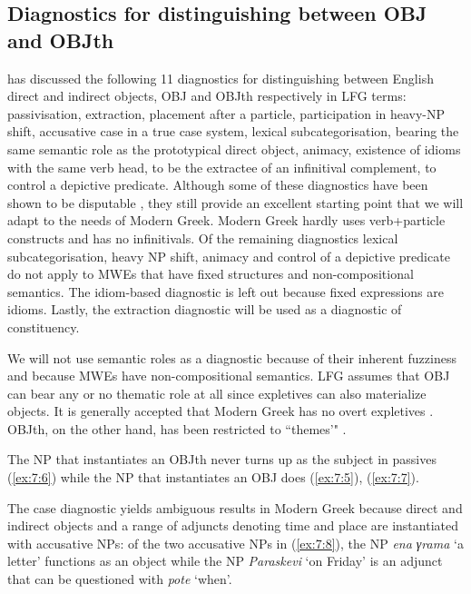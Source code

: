 \documentclass[output=paper]{langsci/langscibook}
\begin{document}
\subsection{Diagnostics for distinguishing between OBJ and OBJth }

\citet{hudson1992} has discussed the following 11 diagnostics for distinguishing between English direct and indirect objects, OBJ and OBJth  respectively in LFG terms: passivisation, extraction, placement after a particle, participation in heavy-NP shift, accusative case in a true case system, lexical subcategorisation, bearing the same semantic role as the prototypical direct object, animacy, existence of idioms with the same verb head, to be the extractee of an infinitival complement, to control a depictive predicate.  Although some of these diagnostics have been shown to be disputable \citep{thomas2012},  they still provide an excellent starting point that we will adapt to the needs of Modern Greek.  Modern Greek hardly uses verb+particle constructs and has no infinitivals. Of the remaining diagnostics lexical subcategorisation, heavy NP shift, animacy and control of a depictive predicate do not apply to MWEs that have fixed structures and non-compositional semantics. The idiom-based diagnostic is left out because fixed expressions are idioms. Lastly, the extraction diagnostic will be used as a diagnostic of constituency. 

We will not use semantic roles as a diagnostic because of their inherent fuzziness \citep{dowty90} and because MWEs have non-compositional semantics.  LFG assumes that OBJ can bear any or no thematic role at all since expletives can also materialize objects. It is generally accepted that Modern Greek has no overt expletives \citep{kotzoglou2001}. OBJth, on the other hand, has been restricted to ``themes'" \citep{bresnanmoshi1990}. 

The NP that instantiates an OBJth never turns up as the subject in passives (\ref{ex:7:6}) while the NP that instantiates an OBJ does (\ref{ex:7:5}), (\ref{ex:7:7}).

The case diagnostic yields ambiguous results in Modern Greek because direct and indirect objects and a range of adjuncts denoting time and place are instantiated with accusative NPs: of the two accusative NPs in (\ref{ex:7:8}), the NP {\normalfont \itshape ena γrama} `a letter' functions as an object while the  NP {\normalfont \itshape Paraskevi} `on Friday' is an adjunct that can be questioned with \textit{pote} `when'.  
\end{document}
